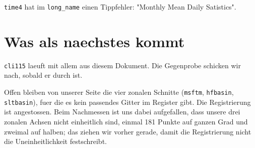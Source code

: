 \documentclass[11pt,a4paper]{article}
\newcommand{\code}[1]{\texttt{\small #1}}
\begin{document}
\code{time4} hat im \code{long\_name} einen Tippfehler: "Monthly Mean Daily
Satistics".

\section{Was als naechstes kommt}

\code{cli115} laeuft mit allem aus diesem Dokument. Die Gegenprobe schicken wir nach,
sobald er durch ist.

Offen bleiben von unserer Seite die vier zonalen Schnitte
(\code{msftm}, \code{hfbasin}, \code{sltbasin}), fuer die es kein passendes Gitter im
Register gibt. Die Registrierung ist angestossen. Beim Nachmessen ist uns dabei
aufgefallen, dass unsere drei zonalen Achsen nicht einheitlich sind, einmal 181
Punkte auf ganzen Grad und zweimal auf halben; das ziehen wir vorher gerade, damit
die Registrierung nicht die Uneinheitlichkeit festschreibt.
\end{document}
